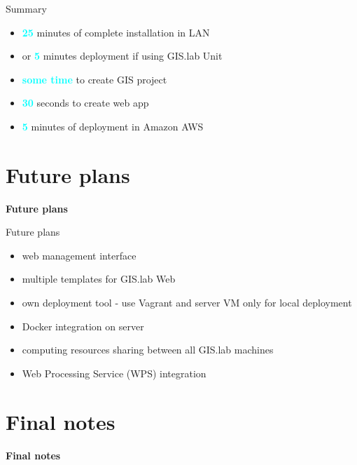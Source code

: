 \documentclass[12pt]{beamer}
\begin{document}
\begin{frame}{Summary}
	\begin{itemize}
		\item \textbf{\textcolor{Cyan}{25}} minutes of complete installation in LAN
		\item or \textbf{\textcolor{Cyan}{5}} minutes deployment if using GIS.lab Unit
		\item \textbf{\textcolor{Cyan}{some time}} to create GIS project
		\item \textbf{\textcolor{Cyan}{30}} seconds to create web app
		\item \textbf{\textcolor{Cyan}{5}} minutes of deployment in Amazon AWS
	\end{itemize}
\end{frame}


\section{Future plans}
\begin{frame}
	\begin{center}
		\LARGE\textbf{Future plans}
	\end{center}
\end{frame}


\begin{frame}{Future plans}
	\begin{itemize}
		\item web management interface
		\item multiple templates for GIS.lab Web
		\item own deployment tool - use Vagrant and server VM only for local deployment
		\item Docker integration on server
		\item computing resources sharing between all GIS.lab machines
		\item Web Processing Service (WPS) integration
	\end{itemize}
\end{frame}


\section{Final notes}
\begin{frame}
	\begin{center}
		\LARGE\textbf{Final notes}
	\end{center}
\end{frame}
\end{document}
